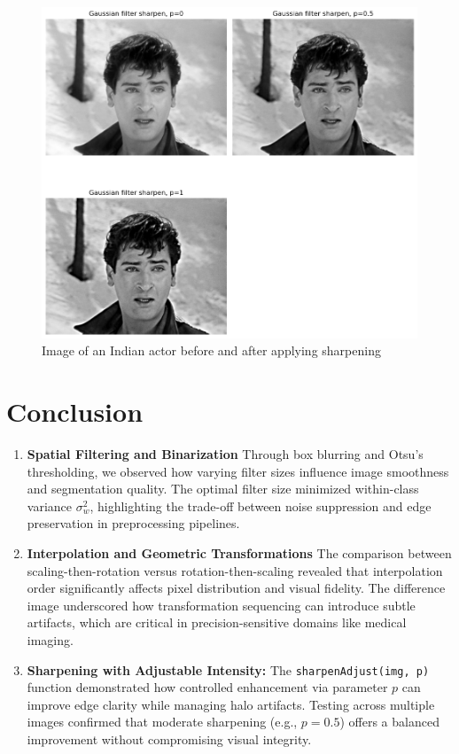 \documentclass[12pt]{article}
\begin{document}
\begin{figure}[t]
    \includegraphics[width=1\linewidth]{rajesh.png}
    \caption{Image of an Indian actor before and after applying sharpening}
    \label{fig:placeholder}
\end{figure}

\section{Conclusion}
\begin{enumerate}
    \item \textbf{Spatial Filtering and Binarization} Through box blurring and Otsu’s thresholding, we observed how varying filter sizes influence image smoothness and segmentation quality. The optimal filter size minimized within-class variance $\sigma_w^2$, highlighting the trade-off between noise suppression and edge preservation in preprocessing pipelines.
    \item \textbf{Interpolation and Geometric Transformations} The comparison between scaling-then-rotation versus rotation-then-scaling revealed that interpolation order significantly affects pixel distribution and visual fidelity. The difference image underscored how transformation sequencing can introduce subtle artifacts, which are critical in precision-sensitive domains like medical imaging.
    \item \textbf{Sharpening with Adjustable Intensity:} 
    The \texttt{sharpenAdjust(img, p)} function demonstrated how controlled 
    enhancement via parameter $p$ can improve edge clarity while managing halo artifacts. 
    Testing across multiple images confirmed that moderate sharpening 
    (e.g., $p=0.5$) offers a balanced improvement without compromising visual integrity.

    
\end{enumerate}
\end{document}
